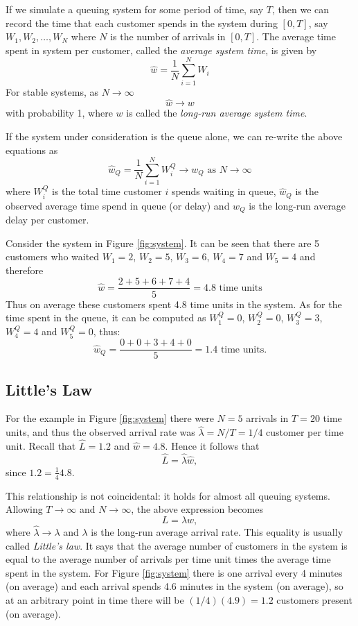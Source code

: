 \documentclass[
]{book}
\begin{document}
If we simulate a queuing system for some period of time, say \(T\), then we can record the time that each customer spends in the system during \([0,T]\), say \(W_1,W_2,\dots,W_N\) where \(N\) is the number of arrivals in \([0,T]\). The average time spent in system per customer, called the \emph{average system time}, is given by
\[
\hat{w} = \frac{1}{N}\sum_{i=1}^N W_i
\]
For stable systems, as \(N\rightarrow \infty\)
\[
\hat{w} \rightarrow w
\]
with probability 1, where \(w\) is called the \emph{long-run average system time}.

If the system under consideration is the queue alone, we can re-write the above equations as
\[
\hat{w}_Q=\frac{1}{N}\sum_{i=1}^NW_i^Q \rightarrow w_Q \mbox{ as } N \rightarrow \infty
\]
where \(W_i^Q\) is the total time customer \(i\) spends waiting in queue, \(\hat{w}_Q\) is the observed average time spend in queue (or delay) and \(w_Q\) is the long-run average delay per customer.

Consider the system in Figure \ref{fig:system}. It can be seen that there are 5 customers who waited \(W_1 =2\), \(W_2 = 5\), \(W_3 = 6\), \(W_4 = 7\) and \(W_5 = 4\) and therefore
\[
\hat{w}=\frac{2+5 +6 + 7 + 4}{5}= 4.8 \mbox{ time units}
\]
Thus on average these customers spent 4.8 time units in the system. As for the time spent in the queue, it can be computed as \(W_1^Q=0\), \(W_2^Q = 0\), \(W_3^Q=3\), \(W_4^Q = 4\) and \(W_5^Q = 0\), thus:
\[
\hat{w}_Q=\frac{0 + 0 + 3 + 4 +0}{5}= 1.4 \mbox{ time units.}
\]

\hypertarget{littles-law}{%
\subsection{Little's Law}\label{littles-law}}

For the example in Figure \ref{fig:system} there were \(N=5\) arrivals in \(T=20\) time units, and thus the observed arrival rate was \(\hat{\lambda}= N/T=1/4\) customer per time unit. Recall that \(\hat{L}=1.2\) and \(\hat{w}=4.8\). Hence it follows that
\[
\hat{L}=\hat{\lambda}\hat{w},
\]
since \(1.2 = \frac{1}{4}4.8\).

This relationship is not coincidental: it holds for almost all queuing systems. Allowing \(T\rightarrow \infty\) and \(N\rightarrow \infty\), the above expression becomes
\[
L=\lambda w,
\]
where \(\hat{\lambda}\rightarrow \lambda\) and \(\lambda\) is the long-run average arrival rate. This equality is usually called \emph{Little's law}. It says that the average number of customers in the system is equal to the average number of arrivals per time unit times the average time spent in the system. For Figure \ref{fig:system} there is one arrival every 4 minutes (on average) and each arrival spends 4.6 minutes in the system (on average), so at an arbitrary point in time there will be \((1/4)(4.9)=1.2\) customers present (on average).
\end{document}
